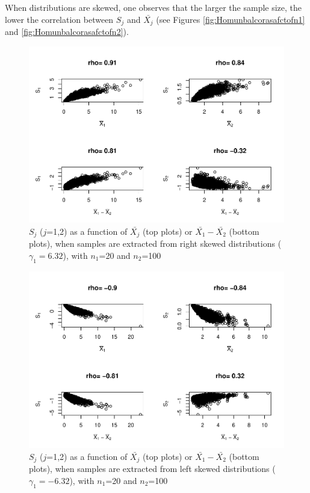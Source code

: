 \documentclass[
  english,
  man,mask]{apa6}
\begin{document}
When distributions are skewed, one observes that the larger the sample size, the lower the correlation between \(S_j\) and \(\bar{X_j}\) (see Figures \ref{fig:Homunbalcorasafctofn1} and \ref{fig:Homunbalcorasafctofn2}).

\begin{figure}
\centering
\includegraphics{Correlation_files/figure-latex/pltSDHomunbalRskew-1.pdf}
\caption{\label{fig:pltSDHomunbalRskew}\(S_j\) (\(j\)=1,2) as a function of \(\bar{X_j}\) (top plots) or \(\bar{X_1}-\bar{X_2}\) (bottom plots), when samples are extracted from right skewed distributions (\(\gamma_1 = 6.32\)), with \(n_1\)=20 and \(n_2\)=100}
\end{figure}

\begin{figure}
\centering
\includegraphics{Correlation_files/figure-latex/pltSDHomunbalLskew-1.pdf}
\caption{\label{fig:pltSDHomunbalLskew}\(S_j\) (\(j\)=1,2) as a function of \(\bar{X_j}\) (top plots) or \(\bar{X_1}-\bar{X_2}\) (bottom plots), when samples are extracted from left skewed distributions (\(\gamma_1 = -6.32\)), with \(n_1\)=20 and \(n_2\)=100}
\end{figure}
\end{document}
